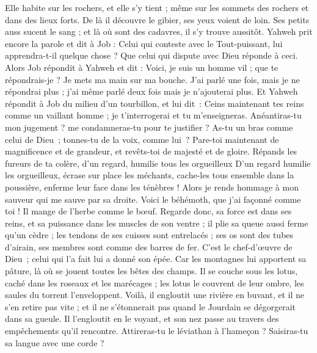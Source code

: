 \begin{multicols}{2}
Elle habite sur les rochers, et elle s'y tient ; même sur les sommets des rochers et dans des lieux forts. 
De là il découvre le gibier, ses yeux voient de loin.
Ses petits auss sucent le sang ; et là où sont des cadavres, il s'y trouve aussitôt.
Yahweh prit encore la parole et dit à Job :
Celui qui conteste avec le Tout-puissant, lui apprendra-t-il quelque chose ? Que celui qui dispute avec Dieu réponde à ceci.
Alors Job répondit à Yahweh et dit :
Voici, je suis un homme vil ; que te répondrais-je ? Je mets ma main sur ma bouche.
J'ai parlé une fois, mais je ne répondrai plus ; j'ai même parlé deux fois mais je n'ajouterai plus.
\VerseOne{}Et Yahweh répondit à Job du milieu d'un tourbillon, et lui dit :
Ceins maintenant tes reins comme un vaillant homme ; je t'interrogerai et tu m'enseigneras.
Anéantiras-tu mon jugement ? me condamneras-tu pour te justifier ?
As-tu un bras comme celui de Dieu ; tonnes-tu de la voix, comme lui ?
Pare-toi maintenant de magnificence et de grandeur, et revêts-toi de majesté et de gloire.
Répands les fureurs de ta colère, d'un regard, humilie tous les orgueilleux
D'un regard humilie les orgueilleux, écrase sur place les méchants,
cache-les tous ensemble dans la poussière, enferme leur face dans les ténèbres !
Alors je rends hommage à mon sauveur qui me sauve par sa droite.
Voici le béhémoth, que j'ai façonné comme toi ! Il mange de l'herbe comme le bœuf.
Regarde donc, sa force est dans ses reins, et sa puissance dans les muscles de son ventre ;
il plie sa queue aussi ferme qu'un cèdre ; les tendons de ses cuisses sont entrelacés ;
ses os sont des tubes d'airain, ses membres sont comme des barres de fer.
C’est le chef-d’œuvre de Dieu ; celui qui l’a fait lui a donné son épée.
Car les montagnes lui apportent sa pâture, là où se jouent toutes les bêtes des champs.
Il se couche sous les lotus, caché dans les roseaux et les marécages ;
les lotus le couvrent de leur ombre, les saules du torrent l'enveloppent.
Voilà, il engloutit une rivière en buvant, et il ne s'en retire pas vite ; et il ne s'étonnerait pas quand le Jourdain se dégorgerait dans sa gueule. 
Il l'engloutit en le voyant, et son nez passe au travers des empêchements qu'il rencontre.  
Attireras-tu le léviathan à l'hameçon ? Saisiras-tu sa langue avec une corde ?

\end{multicols}
